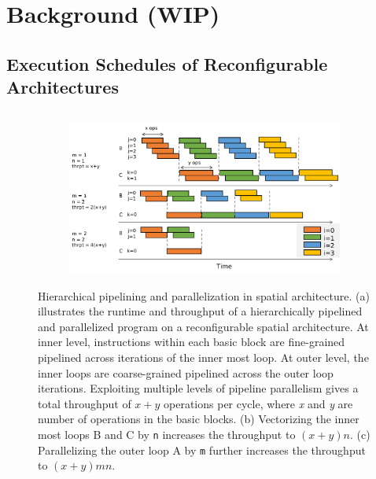 \chapter{Background (WIP)}\label{sec:background}

\section{Execution Schedules of Reconfigurable Architectures} 
\begin{figure}
\begin{subfigure}[b]{0.34\textwidth}
\inputminted{python}{code/spatialeg2.py}
\caption {
}
\end{subfigure}
\hfill
\begin{subfigure}[b]{0.65\textwidth}
\centering
\includegraphics[width=1.0\textwidth]{figs/pipeexec.pdf}
\caption {
}
\end{subfigure}
\caption[Hiearchical pipelining and parallelization on spatial architecture]{
Hierarchical pipelining and parallelization in spatial architecture.
(a) illustrates the runtime and throughput of a hierarchically pipelined and parallelized program on
a reconfigurable spatial architecture. 
At inner level, instructions within each basic
block are fine-grained pipelined across iterations of the inner most loop. 
At outer level, the inner loops are coarse-grained pipelined across the outer loop iterations.
Exploiting multiple levels of pipeline parallelism gives a total throughput of $x+y$ operations per
  cycle, where \emph{x} and \emph{y} are number of operations in the basic blocks.
(b) Vectorizing the inner most loops B and C by \texttt{n} increases the throughput to $(x+y)n$.
(c) Parallelizing the outer loop A by \texttt{m} further increases the throughput to $(x+y)mn$.
}
\label{fig:pipeexec}
\end{figure}

